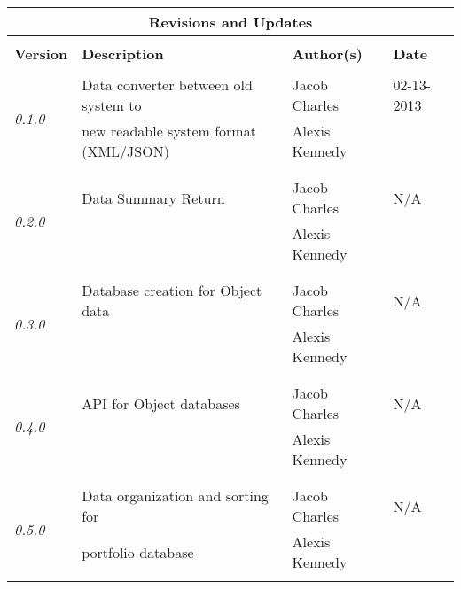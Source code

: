 \documentclass[]{article}
\begin{document}
	\begin{table} \centering
		\begin{tabular}{|l|l|l|l|}
			
			\multicolumn{4}{c}{\LARGE \textbf{Revisions and Updates}} \\
				
			\hline
			& & & \\
			\textbf{Version} & \textbf{Description} & \textbf{Author(s)} & \textbf{Date} \\ 
			\hline
			
			\multirow{4}{*}{\emph{0.1.0}} 
			& & & \\
			& Data converter between old system to & Jacob Charles & 02-13-2013 \\
			& new readable system format (XML/JSON) & Alexis Kennedy & \\
			& & & \\
			\hline
	
			\multirow{4}{*}{\emph{0.2.0}}
				
			& & & \\
			& Data Summary Return & Jacob Charles & N/A \\
			& & Alexis Kennedy & \\
			& & & \\
			\hline
				
			\multirow{4}{*}{\emph{0.3.0}} 
				
			& & & \\
			& Database creation for Object data & Jacob Charles & N/A \\
			& & Alexis Kennedy & \\
			& & & \\
			\hline
				
			\multirow{4}{*}{\emph{0.4.0}} 

			& & & \\
			& API for Object databases & Jacob Charles & N/A \\
			& & Alexis Kennedy & \\
			& & & \\
			\hline
				
			\multirow{4}{*}{\emph{0.5.0}} 
				
			& & & \\
			& Data organization and sorting for & Jacob Charles & N/A \\
			& portfolio database & Alexis Kennedy & \\
			& & & \\
			\hline


\end{tabular}
\end{table}
\end{document}
